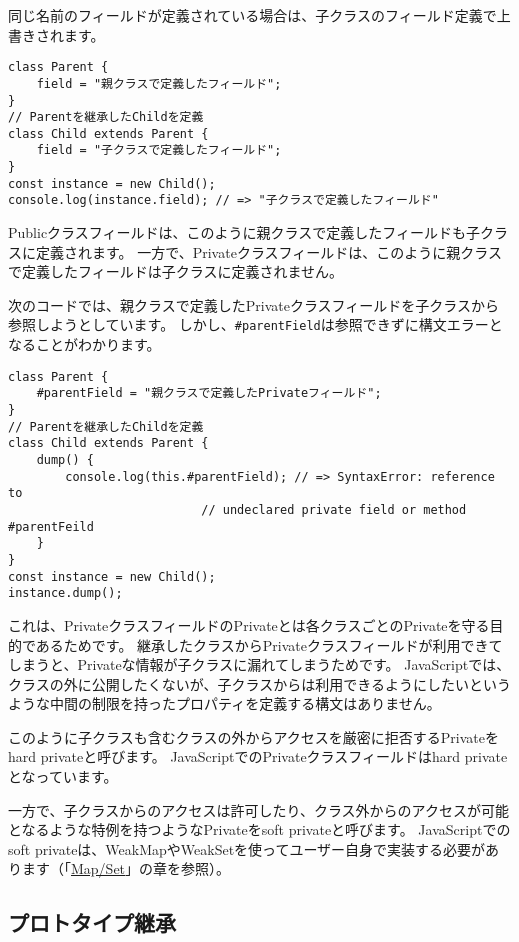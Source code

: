 同じ名前のフィールドが定義されている場合は、子クラスのフィールド定義で上書きされます。

\begin{lstlisting}
class Parent {
    field = "親クラスで定義したフィールド";
}
// Parentを継承したChildを定義
class Child extends Parent {
    field = "子クラスで定義したフィールド";
}
const instance = new Child();
console.log(instance.field); // => "子クラスで定義したフィールド"
\end{lstlisting}

Publicクラスフィールドは、このように親クラスで定義したフィールドも子クラスに定義されます。
一方で、Privateクラスフィールドは、このように親クラスで定義したフィールドは子クラスに定義されません。

次のコードでは、親クラスで定義したPrivateクラスフィールドを子クラスから参照しようとしています。
しかし、\texttt{\#parentField}は参照できずに構文エラーとなることがわかります。

\begin{lstlisting}
class Parent {
    #parentField = "親クラスで定義したPrivateフィールド";
}
// Parentを継承したChildを定義
class Child extends Parent {
    dump() {
        console.log(this.#parentField); // => SyntaxError: reference to 
                           // undeclared private field or method #parentFeild
    }
}
const instance = new Child();
instance.dump();
\end{lstlisting}

これは、PrivateクラスフィールドのPrivateとは各クラスごとのPrivateを守る目的であるためです。
継承したクラスからPrivateクラスフィールドが利用できてしまうと、Privateな情報が子クラスに漏れてしまうためです。
JavaScriptでは、クラスの外に公開したくないが、子クラスからは利用できるようにしたいというような中間の制限を持ったプロパティを定義する構文はありません。

このように子クラスも含むクラスの外からアクセスを厳密に拒否するPrivateをhard privateと呼びます。
JavaScriptでのPrivateクラスフィールドはhard privateとなっています。

一方で、子クラスからのアクセスは許可したり、クラス外からのアクセスが可能となるような特例を持つようなPrivateをsoft privateと呼びます。
JavaScriptでのsoft privateは、WeakMapやWeakSetを使ってユーザー自身で実装する必要があります（「\hyperlink{map-and-set}{Map/Set}」の章を参照）。

\hypertarget{prototype-inheritance}{%
\subsection{プロトタイプ継承}\label{prototype-inheritance}}

